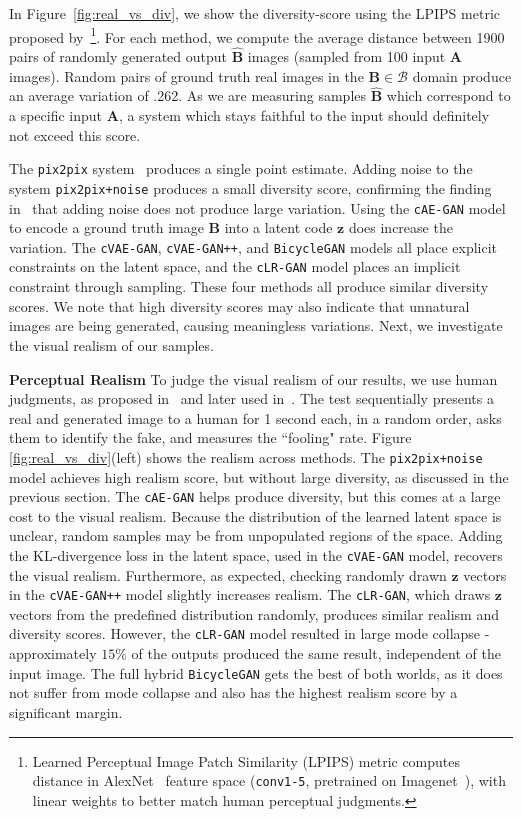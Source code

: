 \documentclass{article}
\newcommand{\pp}{\texttt{pix2pix}\xspace}
\newcommand{\ppn}{\texttt{pix2pix+noise}\xspace}
\newcommand{\cinfogan}{\texttt{cLR-GAN}\xspace}
\newcommand{\cae}{\texttt{cAE-GAN}\xspace}
\newcommand{\cvaegan}{\texttt{cVAE-GAN}\xspace}
\newcommand{\cvaeganp}{\texttt{cVAE-GAN++}\xspace}
\newcommand{\bicycle}{\texttt{BicycleGAN}\xspace} \newcommand{\G}{G\xspace}
\newcommand{\A}{\mathbf{A}\xspace}
\newcommand{\B}{\mathbf{B}\xspace}
\newcommand{\Bh}{\widehat{\mathbf{B}}\xspace}
\newcommand{\z}{\mathbf{z}\xspace}
\begin{document}
In Figure~\ref{fig:real_vs_div}, we show the diversity-score using the LPIPS metric proposed by~\cite{zhang2018unreasonable}\footnote{Learned Perceptual Image Patch Similarity (LPIPS) metric computes distance in AlexNet~\cite{krizhevsky2014one} feature space (\texttt{conv1-5}, pretrained on Imagenet~\citep{russakovsky2015imagenet}), with linear weights to better match human perceptual judgments.}. For each method, we compute the average distance between 1900 pairs of randomly generated output $\Bh$ images (sampled from 100 input $\A$ images). Random pairs of ground truth real images in the $\B \in \mathcal{B}$ domain produce an average variation of .262. As we are measuring samples $\Bh$ which correspond to a specific input $\mathbf{A}$, a system which stays faithful to the input should definitely not exceed this score.

The \pp system~\citep{isola2016image} produces a single point estimate. Adding noise to the system \ppn produces a small diversity score, confirming the finding in~\citep{isola2016image} that adding noise does not produce large variation. Using the \cae model to encode a ground truth image $\B$ into a latent code $\z$ does increase the variation. The \cvaegan, \cvaeganp, and \bicycle models all place explicit constraints on the latent space, and the \cinfogan model places an implicit constraint through sampling. These four methods all produce similar diversity scores. We note that high diversity scores may also indicate that unnatural images are being generated, causing meaningless variations. Next, we investigate the visual realism of our samples.

{\bf Perceptual Realism} To judge the visual realism of our results, we use human judgments, as proposed in~\citep{zhang2016colorful} and later used in~\citep{isola2016image,zhu2017unpaired}. The test sequentially presents a real and generated image to a human for 1 second each, in a random order, asks them to identify the fake, and measures the ``fooling" rate. Figure \ref{fig:real_vs_div}(left) shows the realism across methods. The \ppn model achieves high realism score, but without large diversity, as discussed in the previous section. 
The \cae helps produce diversity, but this comes at a large cost to the visual realism. Because the distribution of the learned latent space is unclear, random samples may be from unpopulated regions of the space. Adding the KL-divergence loss in the latent space, used in the \cvaegan model, recovers the visual realism. Furthermore, as expected, checking randomly drawn $\z$ vectors in the \cvaeganp model slightly increases realism. The \cinfogan, which draws $\z$ vectors from the predefined distribution randomly, produces similar realism and diversity scores. However, the \cinfogan model resulted in large mode collapse - approximately $15\%$ of the outputs produced the same result, independent of the input image. The full hybrid \bicycle gets the best of both worlds, as it does not suffer from mode collapse and also has the highest realism score by a significant margin.  
\end{document}
